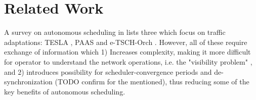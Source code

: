 \documentclass[journal,comsoc]{IEEEtran}
\begin{document}
\section{Related Work}
A survey on autonomous scheduling in \cite{EmpiricalSurveyAutonomousElsts2020} lists three which focus on traffic adaptations: TESLA \cite{TESLATrafficAwareJeong2019}, PAAS \cite{ParameterizedslotschedulingJung2018} and e-TSCH-Orch \cite{AutonomoustrafficawareRekik2018}. However, all of these require exchange of information which 1) Increases complexity, making it more difficult for operator to understand the network operations, i.e. the "visibility problem" \cite{EmpiricalSurveyAutonomousElsts2020}, and 2)  introduces possibility for scheduler-convergence periods and de-synchronization (TODO confirm for the mentioned), thus reducing some of the key benefits of autonomous scheduling.
\end{document}
